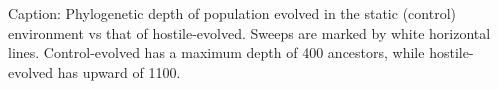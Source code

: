Caption: Phylogenetic depth of population evolved in the static (control) environment vs that of hostile-evolved. Sweeps are marked by white horizontal lines. Control-evolved has a maximum depth of 400 ancestors, while hostile-evolved has upward of 1100.